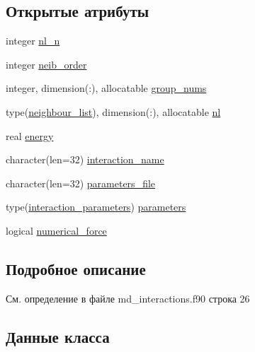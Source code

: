 \subsection*{Открытые атрибуты}
\begin{DoxyCompactItemize}
\item 
integer \mbox{\hyperlink{structmd__interactions_1_1interaction_a45da5fb326e67bc08da38f1cc7b5ff2e}{nl\+\_\+n}}
\item 
integer \mbox{\hyperlink{structmd__interactions_1_1interaction_a1650598e16e38fec2ea5bd093b7cc634}{neib\+\_\+order}}
\item 
integer, dimension(\+:), allocatable \mbox{\hyperlink{structmd__interactions_1_1interaction_a7780370c71abfd1418aba1cc0037f2d1}{group\+\_\+nums}}
\item 
type(\mbox{\hyperlink{structmd__general_1_1neighbour__list}{neighbour\+\_\+list}}), dimension(\+:), allocatable \mbox{\hyperlink{structmd__interactions_1_1interaction_a43d6b246e83e0f832461d029fc922de6}{nl}}
\item 
real \mbox{\hyperlink{structmd__interactions_1_1interaction_a3a150970039b7be4b08b249e30d695e9}{energy}}
\item 
character(len=32) \mbox{\hyperlink{structmd__interactions_1_1interaction_a098dcff72c607d6b5e6a4f0f522b56ed}{interaction\+\_\+name}}
\item 
character(len=32) \mbox{\hyperlink{structmd__interactions_1_1interaction_a1ed21689035f3b5b3bae8aec62a081df}{parameters\+\_\+file}}
\item 
type(\mbox{\hyperlink{structmd__interactions_1_1interaction__parameters}{interaction\+\_\+parameters}}) \mbox{\hyperlink{structmd__interactions_1_1interaction_ab2041dbe838781954511d4738535fa98}{parameters}}
\item 
logical \mbox{\hyperlink{structmd__interactions_1_1interaction_a54ce703312ec9215da8f704c0134814b}{numerical\+\_\+force}}
\end{DoxyCompactItemize}


\subsection{Подробное описание}


См. определение в файле md\+\_\+interactions.\+f90 строка 26



\subsection{Данные класса}
\mbox{\label{structmd__interactions_1_1interaction_a3a150970039b7be4b08b249e30d695e9}} 
